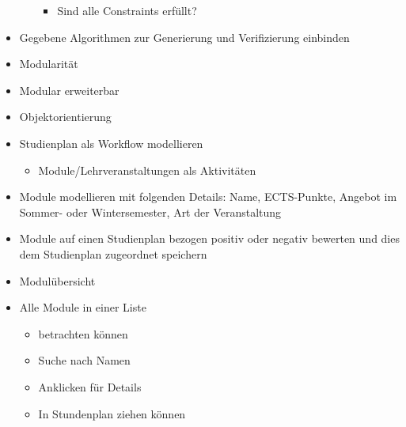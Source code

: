 \begin{itemize}[nosep]
\begin{itemize}[nosep]
\begin{itemize}[nosep]
			\item Sind alle Constraints erfüllt?
		\end{itemize}
	\end{itemize}
	\item Gegebene Algorithmen zur Generierung und Verifizierung einbinden
	\item Modularität
	\item Modular erweiterbar
	\item Objektorientierung
	\item Studienplan als Workflow modellieren
	\begin{itemize}[nosep]
		\item Module/Lehrveranstaltungen als Aktivitäten
	\end{itemize}
	\item Module modellieren mit folgenden Details: Name, ECTS-Punkte, Angebot im Sommer- oder Wintersemester, Art der Veranstaltung
	\item Module auf einen Studienplan bezogen positiv oder negativ bewerten und dies dem Studienplan zugeordnet speichern
	\item Modulübersicht
		\item Alle Module in einer Liste
			\begin{itemize}[nosep]
				\item betrachten können
				\item Suche nach Namen
				\item Anklicken für Details
				\item In Stundenplan ziehen können
			\end{itemize}
\end{itemize}

